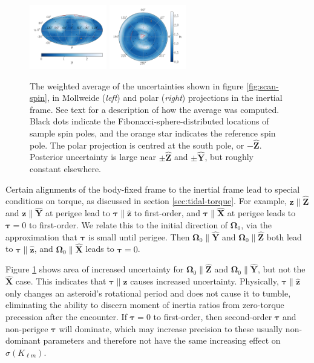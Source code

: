 \documentclass[fleqn,usenatbib]{mnras}
\newcommand{\unit}[1]{\bm{\hat{#1}}}
\begin{document}
\begin{figure}
  \centering
  \includegraphics[width=0.3\textwidth]{figs/spin-pole-avg-mollweide.png}
  \includegraphics[width=0.3\textwidth]{figs/spin-pole-avg-polar.png}
  \caption{The weighted average of the uncertainties shown in figure \ref{fig:scan-spin}, in Mollweide (\textit{left}) and polar (\textit{right}) projections in the inertial frame. See text for a description of how the average was computed. Black dots indicate the Fibonacci-sphere-distributed locations of sample spin poles, and the orange star indicates the reference spin pole. The polar projection is centred at the south pole, or $-\unit Z$. Posterior uncertainty is large near $\pm \unit Z$ and $\pm \unit Y$, but roughly constant elsewhere.}
  \label{fig:scan-spin-avg}
\end{figure}

Certain alignments of the body-fixed frame to the inertial frame lead to special conditions on torque, as discussed in section \ref{sec:tidal-torque}. For example, $\bm z \parallel \unit Z$ and $\bm z \parallel \unit Y$ at perigee lead to $\bm \tau \parallel \unit z$ to first-order, and $\bm \tau \parallel \unit X$ at perigee leads to $\bm \tau = 0$ to first-order. We relate this to the initial direction of $\bm \Omega_0$, via the approximation that $\bm \tau$ is small until perigee. Then $\bm \Omega_0 \parallel \unit Y$ and $\bm \Omega_0 \parallel \unit Z$ both lead to $\bm \tau \parallel \unit z$, and $\bm \Omega_0 \parallel \unit X$ leads to $\bm \tau = 0$.

Figure \ref{fig:scan-spin-avg} shows area of increased uncertainty for $\bm \Omega_0 \parallel \unit Z$ and $\bm \Omega_0 \parallel \unit Y$, but not the $\unit X$ case. This indicates that $\bm \tau \parallel \unit z$ causes increased uncertainty. Physically, $\bm \tau \parallel \unit z$ only changes an asteroid's rotational period and does not cause it to tumble, eliminating the ability to discern moment of inertia ratios from zero-torque precession after the encounter. If $\bm \tau = 0$ to first-order, then second-order $\bm \tau$ and non-perigee $\bm \tau$ will dominate, which may increase precision to these usually non-dominant parameters and therefore not have the same increasing effect on $\sigma(K_{\ell m})$.
\end{document}
